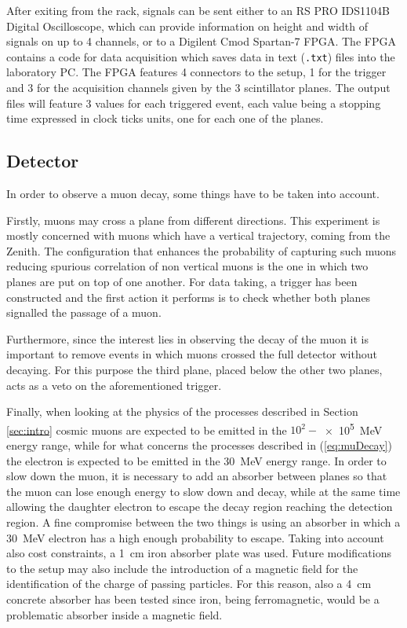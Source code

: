 \documentclass[../main.tex]{subfiles}
\begin{document}
After exiting from the rack, signals can be sent either to an RS PRO IDS1104B Digital Oscilloscope, which can provide information on height and width of signals on up to 4 channels, or to a Digilent Cmod Spartan-7 FPGA. The FPGA contains a code for data acquisition which saves data in text (\texttt{.txt}) files into the laboratory PC. The FPGA features 4 connectors to the setup, 1 for the trigger and 3 for the acquisition channels given by the 3 scintillator planes. The output files will feature 3 values for each triggered event, each value being a stopping time expressed in clock ticks units, one for each one of the planes. 

\subsection{Detector}
\label{sub:detector}
In order to observe a muon decay, some things have to be taken into account. 

Firstly,  muons may cross a plane from different directions. This experiment is mostly concerned with muons which have a vertical trajectory, coming from the Zenith. The configuration that enhances the probability of capturing such muons reducing spurious correlation of non vertical muons is the one in which two planes are put on top of one another. For data taking, a trigger has been constructed and the first action it performs is to check whether both planes signalled the passage of a muon.

Furthermore, since the interest lies in observing the decay of the muon it is important to remove events in which muons crossed the full detector without decaying. For this purpose the third plane, placed below the other two planes, acts as a veto on the aforementioned trigger.

Finally, when looking at the physics of the processes described in Section  \ref{sec:intro} cosmic muons are expected to be emitted in the $10^2-$\SI{e5}{\MeV} energy range, while for what concerns the processes described in (\ref{eq:muDecay}) the electron is expected to be emitted in the \SI{30}{MeV} energy range. In order to slow down the muon, it is necessary to add an absorber between planes so that the muon can lose enough energy to slow down and decay, while at the same time allowing the daughter electron to escape the decay region reaching the detection region. A fine compromise between the two things is using an absorber in which a \SI{30}{\MeV} electron has a high enough probability to escape. Taking into account also cost constraints, a \SI{1}{cm} iron absorber plate was used. Future modifications to the setup may also include the introduction of a magnetic field for the identification of the charge of passing particles. For this reason, also a \SI{4}{\centi \meter} concrete absorber has been tested since iron, being ferromagnetic, would be a problematic absorber inside a magnetic field.\\
\end{document}
